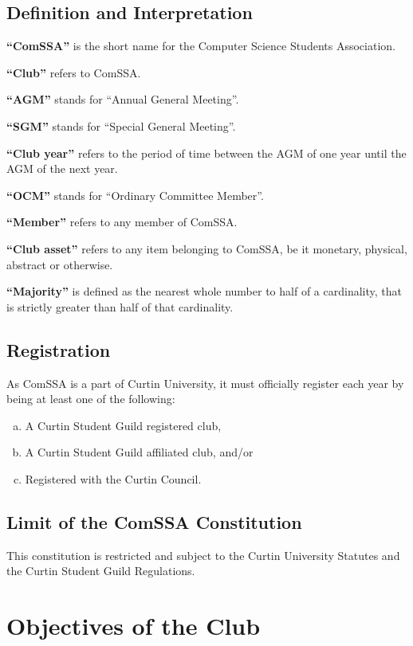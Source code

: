 \documentclass[a4paper,12pt]{article}
\begin{document}
\subsection{Definition and Interpretation}

\textbf{``ComSSA''} is the short name for the Computer Science Students Association.

\textbf{``Club''} refers to ComSSA.

\textbf{``AGM''} stands for ``Annual General Meeting''.

\textbf{``SGM''} stands for ``Special General Meeting''.

\textbf{``Club year''} refers to the period of time between the AGM of one year until the AGM of the next year.

\textbf{``OCM''} stands for ``Ordinary Committee Member''.

\textbf{``Member''} refers to any member of ComSSA.

\textbf{``Club asset''} refers to any item belonging to ComSSA, be it monetary, physical, abstract or otherwise.

\textbf{``Majority''} is defined as the nearest whole number to half of a cardinality, that is strictly greater than half of that cardinality.

\subsection{Registration}

As ComSSA is a part of Curtin University, it must officially register each year by being at least one of the following:

\begin{enumerate}[a)]
	\item A Curtin Student Guild registered club,
	\item A Curtin Student Guild affiliated club, and/or
	\item Registered with the Curtin Council.
\end{enumerate}

\subsection{Limit of the ComSSA Constitution}

This constitution is restricted and subject to the Curtin University Statutes and the Curtin Student Guild Regulations.

\section{Objectives of the Club}
\end{document}
